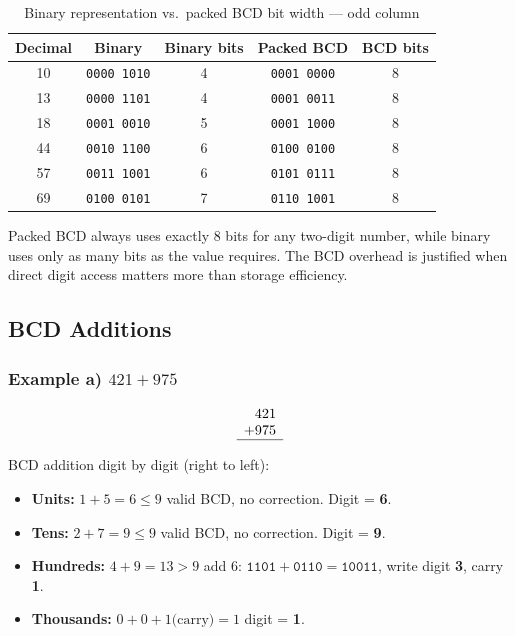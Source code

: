 \documentclass[12pt,a4paper]{article}
\begin{document}
\begin{table}[H]
  \centering
  \caption{Binary representation vs.\ packed BCD bit width --- odd column}
  \renewcommand{\arraystretch}{1.3}
  \begin{tabular}{|c|c|c|c|c|}
    \hline
    \textbf{Decimal} & \textbf{Binary} & \textbf{Binary bits} & \textbf{Packed BCD} & \textbf{BCD bits} \\
    \hline
    10 & \texttt{0000\ 1010} & 4 & \texttt{0001\ 0000} & 8 \\
    13 & \texttt{0000\ 1101} & 4 & \texttt{0001\ 0011} & 8 \\
    18 & \texttt{0001\ 0010} & 5 & \texttt{0001\ 1000} & 8 \\
    44 & \texttt{0010\ 1100} & 6 & \texttt{0100\ 0100} & 8 \\
    57 & \texttt{0011\ 1001} & 6 & \texttt{0101\ 0111} & 8 \\
    69 & \texttt{0100\ 0101} & 7 & \texttt{0110\ 1001} & 8 \\
    \hline
  \end{tabular}
\end{table}

\noindent Packed BCD always uses exactly 8 bits for any two-digit number, while
binary uses only as many bits as the value requires. The BCD overhead is
justified when direct digit access matters more than storage efficiency.

\subsection{BCD Additions}

\subsubsection*{Example a) \quad $421 + 975$}

\[
\begin{array}{r}
  421 \\
+ 975 \\
\hline
\end{array}
\]

BCD addition digit by digit (right to left):

\begin{itemize}
  \item \textbf{Units:} $1 + 5 = 6 \leq 9$ \quad valid BCD, no correction. Digit = \textbf{6}.
  \item \textbf{Tens:} $2 + 7 = 9 \leq 9$ \quad valid BCD, no correction. Digit = \textbf{9}.
  \item \textbf{Hundreds:} $4 + 9 = 13 > 9$ \quad add $6$:
        $\texttt{1101} + \texttt{0110} = \texttt{10011}$, write digit \textbf{3}, carry \textbf{1}.
  \item \textbf{Thousands:} $0 + 0 + 1\text{(carry)} = 1$ \quad digit = \textbf{1}.
\end{itemize}
\end{document}
